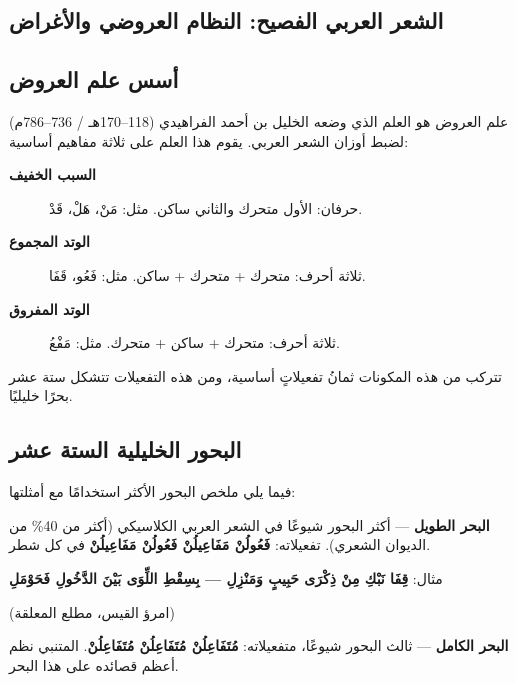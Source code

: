 \clearpage
\langsep{}

\begin{otherlanguage}{arabic}

\section*{الشعر العربي الفصيح: النظام العروضي والأغراض}

\subsection*{أسس علم العروض}

علم العروض هو العلم الذي وضعه الخليل بن أحمد الفراهيدي (118–170هـ / 736–786م) لضبط أوزان الشعر العربي. يقوم هذا العلم على ثلاثة مفاهيم أساسية:

\begin{description}
  \item[\textbf{السبب الخفيف}] حرفان: الأول متحرك والثاني ساكن. مثل: مَنْ، هَلْ، قَدْ.
  \item[\textbf{الوتد المجموع}] ثلاثة أحرف: متحرك + متحرك + ساكن. مثل: فَعُو، قَفَا.
  \item[\textbf{الوتد المفروق}] ثلاثة أحرف: متحرك + ساكن + متحرك. مثل: مَفْعُ.
\end{description}

تتركب من هذه المكونات ثمانُ تفعيلاتٍ أساسية، ومن هذه التفعيلات تتشكل ستة عشر بحرًا خليليًا.

\subsection*{البحور الخليلية الستة عشر}

فيما يلي ملخص البحور الأكثر استخدامًا مع أمثلتها:

\textbf{البحر الطويل} — أكثر البحور شيوعًا في الشعر العربي الكلاسيكي (أكثر من 40\% من الديوان الشعري). تفعيلاته: \textbf{فَعُولُنْ مَفَاعِيلُنْ فَعُولُنْ مَفَاعِيلُنْ} في كل شطر.

مثال: \textbf{قِفَا نَبْكِ مِنْ ذِكْرَى حَبِيبٍ وَمَنْزِلِ --- بِسِقْطِ اللِّوَى بَيْنَ الدَّخُولِ فَحَوْمَلِ}

(امرؤ القيس، مطلع المعلقة)

\textbf{البحر الكامل} — ثالث البحور شيوعًا، متفعيلاته: \textbf{مُتَفَاعِلُنْ مُتَفَاعِلُنْ مُتَفَاعِلُنْ}. المتنبي نظم أعظم قصائده على هذا البحر.


\end{otherlanguage}

